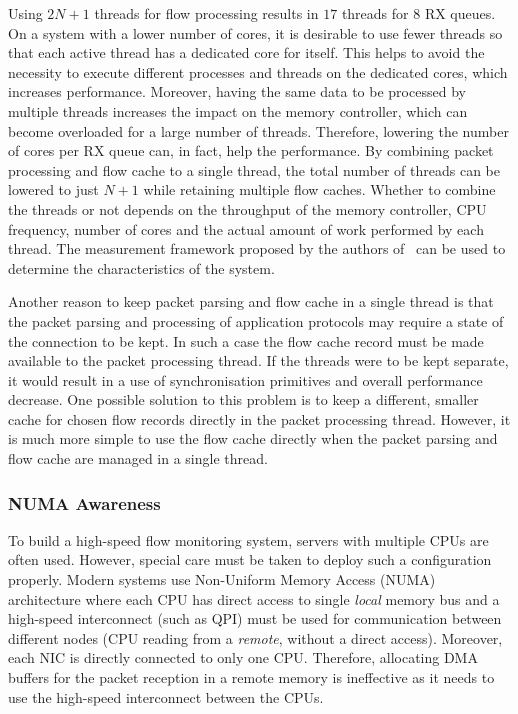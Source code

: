 Using $2N+1$ threads for flow processing results in $17$ threads for $8$ RX queues. On a system with a lower number of cores, it is desirable to use fewer threads so that each active thread has a dedicated core for itself. This helps to avoid the necessity to execute different processes and threads on the dedicated cores, which increases performance. Moreover, having the same data to be processed by multiple threads increases the impact on the memory controller, which can become overloaded for a large number of threads. Therefore, lowering the number of cores per RX queue can, in fact, help the performance. By combining packet processing and flow cache to a single thread, the total number of threads can be lowered to just $N+1$ while retaining multiple flow caches. Whether to combine the threads or not depends on the throughput of the memory controller, CPU frequency, number of cores and the actual amount of work performed by each thread. The measurement framework proposed by the authors of~\cite{Gallenmueller-2015-Comparison} can be used to determine the characteristics of the system.


Another reason to keep packet parsing and flow cache in a single thread is that the packet parsing and processing of application protocols may require a state of the connection to be kept. In such a case the flow cache record must be made available to the packet processing thread. If the threads were to be kept separate, it would result in a use of synchronisation primitives and overall performance decrease. One possible solution to this problem is to keep a different, smaller cache for chosen flow records directly in the packet processing thread. However, it is much more simple to use the flow cache directly when the packet parsing and flow cache are managed in a single thread.

\subsubsection{NUMA Awareness}

To build a high-speed flow monitoring system, servers with multiple CPUs are often used. However, special care must be taken to deploy such a configuration properly. Modern systems use Non-Uniform Memory Access (NUMA) architecture where each CPU has direct access to single \emph{local} memory bus and a high-speed interconnect (such as QPI) must be used for communication between different nodes (CPU reading from a \emph{remote}, without a direct access). Moreover, each NIC is directly connected to only one CPU. Therefore, allocating DMA buffers for the packet reception in a remote memory is ineffective as it needs to use the high-speed interconnect between the CPUs.

